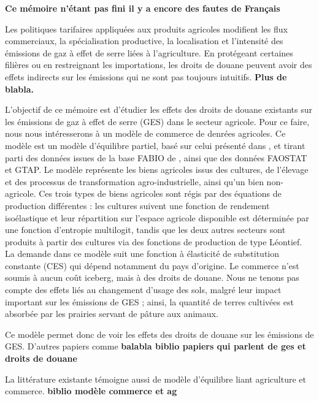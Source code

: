\textbf{Ce mémoire n'étant pas fini il y a encore des fautes de Français}

Les politiques tarifaires appliquées aux produits agricoles modifient les flux commerciaux, la spécialisation productive, la localisation et l'intensité des émissions de gaz à effet de serre liées à l'agriculture. En protégeant certaines filières ou en restreignant les importations, les droits de douane peuvent avoir des effets indirects sur les émissions qui ne sont pas toujours intuitifs. \textbf{Plus de blabla.}

L'objectif de ce mémoire est d'étudier les effets des droits de douane existants sur les émissions de gaz à effet de serre (GES) dans le secteur agricole. Pour ce faire, nous nous intéresserons à un modèle de commerce de denrées agricoles. Ce modèle est un modèle d'équilibre partiel, basé sur celui présenté dans \cite{Gouel2021}, et tirant parti des données issues de la base FABIO de \cite{Bruckner2019}, ainsi que des données FAOSTAT et GTAP. Le modèle représente les biens agricoles issus des cultures, de l'élevage et des processus de transformation agro-industrielle, ainsi qu'un bien non-agricole. Ces trois types de biens agricoles sont régis par des équations de production différentes : les cultures suivent une fonction de rendement isoélastique et leur répartition sur l'espace agricole disponible est déterminée par une fonction d'entropie multilogit, tandis que les deux autres secteurs sont produits à partir des cultures via des fonctions de production de type Léontief. La demande dans ce modèle suit une fonction à élasticité de substitution constante (CES) qui dépend notamment du pays d'origine. Le commerce n'est soumis à aucun coût iceberg, mais à des droits de douane. Nous ne tenons pas compte des effets liés au changement d'usage des sols, malgré leur impact important sur les émissions de GES ; ainsi, la quantité de terres cultivées est absorbée par les prairies servant de pâture aux animaux.

Ce modèle permet donc de voir les effets des droits de douane sur les émissions de GES. D'autres papiers comme \textbf{balabla biblio papiers qui parlent de ges et droits de douane}

La littérature existante témoigne aussi de modèle d'équilibre liant agriculture et commerce. \textbf{biblio modèle commerce et ag}




